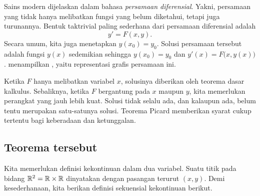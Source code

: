 Sains modern dijelaskan dalam bahasa
\emph{persamaan diferensial}.
Yakni, persamaan yang tidak hanya melibatkan fungsi yang belum diketahui, tetapi juga
turunannya.  Bentuk taktrivial paling sederhana dari persamaan diferensial adalah
\emph{}
\begin{equation*}
y' = F(x,y) .
\end{equation*}
Secara umum, kita juga menetapkan \emph{}
$y(x_0)=y_0$.  Solusi
persamaan tersebut adalah fungsi $y(x)$ sedemikian sehingga
$y(x_0)=y_0$ dan $y'(x) = F\bigl(x,y(x)\bigr)$.
 menampilkan
\emph{}, yaitu representasi grafis persamaan ini.
\begin{myfigureht}
\caption{Sebuah \emph{medan kemiringan} yang memberikan kemiringan $F(x,y)$ di setiap titik;
dalam kasus ini $F(x,y)=x(1-y)$.  Sebuah solusi digambar melewati titik
$(x_0,y_0)=(1,0.3)$; perhatikan bagaimana grafik itu mengikuti arah-arah kemiringan tersebut.\label{fig:sampleslopes}}
\end{myfigureht}

Ketika $F$ hanya melibatkan variabel $x$, solusinya diberikan oleh
teorema dasar kalkulus.  Sebaliknya, ketika $F$ bergantung
pada $x$ maupun $y$, kita memerlukan perangkat yang jauh lebih kuat.  Solusi
tidak selalu ada, dan kalaupun ada, belum tentu merupakan satu-satunya solusi.
Teorema Picard memberikan syarat cukup tertentu bagi keberadaan
dan ketunggalan.

\subsection{Teorema tersebut}

Kita memerlukan definisi kekontinuan dalam dua variabel.  Suatu titik pada
bidang ${\mathbb{R}}^2 = {\mathbb{R}} \times {\mathbb{R}}$ dinyatakan dengan pasangan terurut $(x,y)$.
Demi kesederhanaan,
kita berikan definisi sekuensial kekontinuan berikut.

